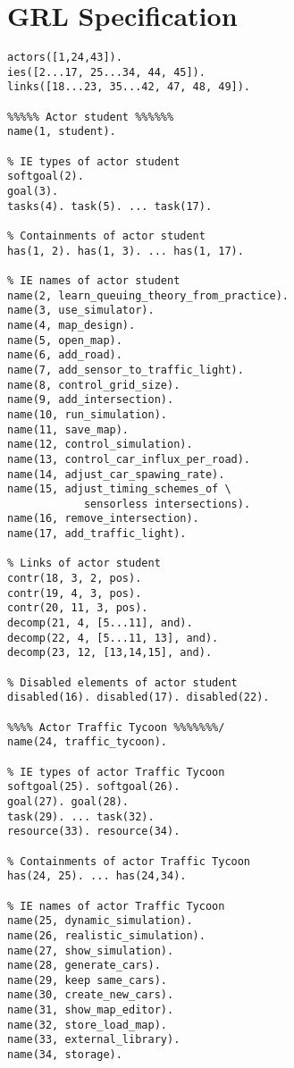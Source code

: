 \section{GRL Specification}
\label{ch:grlspec}

\vspace{-0.5cm}

\begin{multicols}{2}
\begin{Verbatim}[fontsize=\scriptsize]
%% GRL Elements
actors([1,24,43]).
ies([2...17, 25...34, 44, 45]).
links([18...23, 35...42, 47, 48, 49]).

%%%%% Actor student %%%%%%
name(1, student).

% IE types of actor student
softgoal(2).
goal(3).
tasks(4). task(5). ... task(17).

% Containments of actor student
has(1, 2). has(1, 3). ... has(1, 17).

% IE names of actor student
name(2, learn_queuing_theory_from_practice).
name(3, use_simulator).
name(4, map_design).
name(5, open_map).
name(6, add_road).
name(7, add_sensor_to_traffic_light).
name(8, control_grid_size).
name(9, add_intersection).
name(10, run_simulation).
name(11, save_map).
name(12, control_simulation).
name(13, control_car_influx_per_road).
name(14, adjust_car_spawing_rate).
name(15, adjust_timing_schemes_of \
            sensorless intersections).
name(16, remove_intersection).
name(17, add_traffic_light).

% Links of actor student
contr(18, 3, 2, pos).
contr(19, 4, 3, pos).
contr(20, 11, 3, pos).
decomp(21, 4, [5...11], and).
decomp(22, 4, [5...11, 13], and).
decomp(23, 12, [13,14,15], and).

% Disabled elements of actor student
disabled(16). disabled(17). disabled(22).

%%%% Actor Traffic Tycoon %%%%%%%/
name(24, traffic_tycoon).

% IE types of actor Traffic Tycoon
softgoal(25). softgoal(26).
goal(27). goal(28).
task(29). ... task(32).
resource(33). resource(34).

% Containments of actor Traffic Tycoon
has(24, 25). ... has(24,34).

% IE names of actor Traffic Tycoon
name(25, dynamic_simulation).
name(26, realistic_simulation).
name(27, show_simulation).
name(28, generate_cars).
name(29, keep same_cars).
name(30, create_new_cars).
name(31, show_map_editor).
name(32, store_load_map).
name(33, external_library).
name(34, storage).


\end{Verbatim}
\end{multicols}
